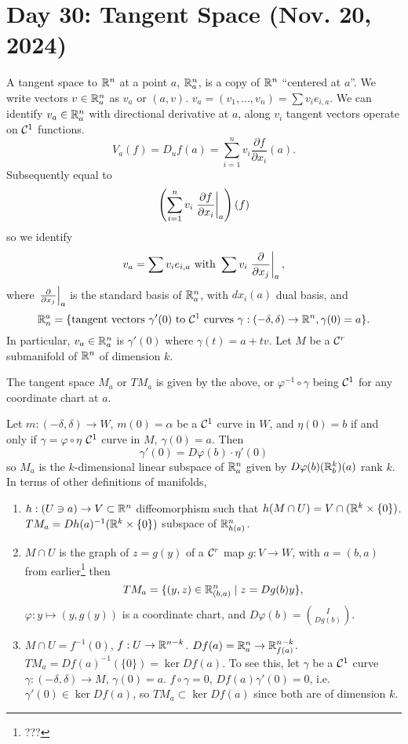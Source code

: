 \section{Day 30: Tangent Space (Nov. 20, 2024)}
A tangent space to $\mathbb R^n$ at a point $a$, $\mathbb R_a^n$, is a copy of $\mathbb R^n$ ``centered at $a$''. We write vectors $v \in \mathbb R_a^n$ as $v_a$ or $(a, v)$. $v_a = (v_1, \dots, v_n) = \sum v_i e_{i,a}$. We can identify $v_a \in \mathbb R_a^n$ with directional derivative at $a$, along $v_i$ tangent vectors operate on $\mathcal C^1$ functions.
\[ V_a(f) = D_u f(a) = \sum_{i=1}^n v_i \frac{\partial f}{\partial x_i}(a). \]
Subsequently equal to
\[ \left( \sum_{i=1}^n v_i \left.\frac{\partial f}{\partial x_i}\right\rvert_{a}^{} \right)(f) \]
so we identify
\[ v_a = \sum v_ie_{i,a} \text{ with } \sum v_i \left.\frac{\partial}{\partial x_j}\right\rvert_{a}^{}, \]
where $\left.\frac{\partial}{\partial x_j}\right\rvert_{a}^{}$ is the standard basis of $\mathbb R^n_a$, with $dx_i(a)$ dual basis, and
\[ \mathbb R_n^a = \{ \text{tangent vectors } \gamma'(0) \text{ to } \mathcal C^1 \text{ curves } \gamma : (-\delta, \delta) \to \mathbb R^n, \gamma(0) = a \}. \]
In particular, $v_a \in \mathbb R_a^n$ is $\gamma'(0)$ where $\gamma(t) = a + tv$. Let $M$ be a $\mathcal C^r$ submanifold of $\mathbb R^n$ of dimension $k$.
\begin{definition}
    The tangent space $M_a$ or $TM_a$ is given by the above, or $\varphi^{-1} \circ \gamma$ being $\mathcal C^1$ for any coordinate chart at $a$.
\end{definition}
\noindent Let $m : (-\delta, \delta) \to W$, $m(0) = \alpha$ be a $\mathcal C^1$ curve in $W$, and $\eta(0) = b$ if and only if $\gamma = \varphi \circ \eta$ $\mathcal C^1$ curve in $M$, $\gamma(0) = a$. Then
\[ \gamma'(0) = D \varphi(b) \cdot \eta'(0) \]
so $M_a$ is the $k$-dimensional linear subspace of $\mathbb R_a^n$ given by $D \varphi(b)(\mathbb R_b^k)(a)$ rank $k$. In terms of other definitions of manifolds,
\begin{enumerate}[label=(\roman*)]
    \item $h : (U \ni a) \to V \subset \mathbb R^n$ diffeomorphism such that $h(M \cap U) = V \cap (\mathbb R^k \times \{0\})$. $TM_a = Dh(a)^{-1} (\mathbb R^k \times \{0\})$ subspace of $\mathbb R_{h(a)}^n$.
    \item $M \cap U$ is the graph of $z = g(y)$ of a $\mathcal C^r$ map $g : V \to W$, with $a = (b, a)$ from earlier\footnote{???} then
    \[ TM_a = \{(y, z) \in \mathbb R_{(b, a)}^n \mid z = Dg(b) y \}, \]
    $\varphi : y \mapsto (y, g(y))$ is a coordinate chart, and $D \varphi(b) = \binom{I}{Dg(b)}$.
    \item $M \cap U = f^{-1}(0)$, $f : U \to \mathbb R^{n-k}$. $Df(a) = \mathbb R_a^n \to \mathbb R_{f(a)}^{n-k}$. $TM_a = Df(a)^{-1}(\{0\}) = \ker Df(a)$. To see this, let $\gamma$ be a $\mathcal C^1$ curve $\gamma : (-\delta, \delta) \to M$, $\gamma(0) = a$. $f \circ \gamma = 0$, $Df(a)\gamma'(0) = 0$, i.e. $\gamma'(0) \in \ker Df(a)$, so $TM_a \subset \ker Df(a)$ since both are of dimension $k$.  
\end{enumerate}
